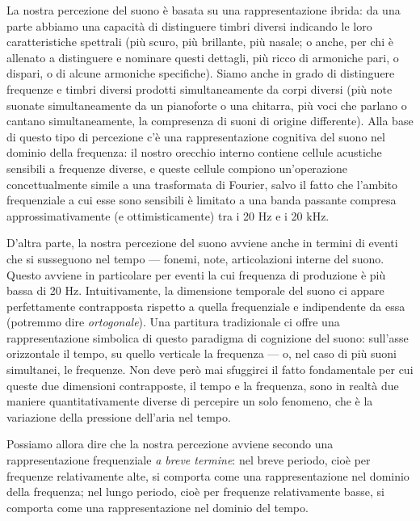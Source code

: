 \documentclass[11pt]{report}
\begin{document}
La nostra percezione del suono è basata su una rappresentazione ibrida: da una parte abbiamo una capacità di distinguere timbri diversi indicando le loro caratteristiche spettrali (più scuro, più brillante, più nasale; o anche, per chi è allenato a distinguere e nominare questi dettagli, più ricco di armoniche pari, o dispari, o di alcune armoniche specifiche). Siamo anche in grado di distinguere frequenze e timbri diversi prodotti simultaneamente da corpi diversi (più note suonate simultaneamente da un pianoforte o una chitarra, più voci che parlano o cantano simultaneamente, la compresenza di suoni di origine differente). Alla base di questo tipo di percezione c'è una rappresentazione cognitiva del suono nel dominio della frequenza: il nostro orecchio interno contiene cellule acustiche sensibili a frequenze diverse, e queste cellule compiono un'operazione concettualmente simile a una trasformata di Fourier, salvo il fatto che l'ambito frequenziale a cui esse sono sensibili è limitato a una banda passante compresa approssimativamente (e ottimisticamente) tra i 20 Hz e i 20 kHz.

D'altra parte, la nostra percezione del suono avviene anche in termini di eventi che si susseguono nel tempo --- fonemi, note, articolazioni interne del suono. Questo avviene in particolare per eventi la cui frequenza di produzione è più bassa di 20 Hz.  Intuitivamente, la dimensione temporale del suono ci appare perfettamente contrapposta rispetto a quella frequenziale e indipendente da essa (potremmo dire \emph{ortogonale}). Una partitura tradizionale ci offre una rappresentazione simbolica di questo paradigma di cognizione del suono: sull'asse orizzontale il tempo, su quello verticale la frequenza --- o, nel caso di più suoni simultanei, le frequenze. Non deve però mai sfuggirci il fatto fondamentale per cui queste due dimensioni contrapposte, il tempo e la frequenza, sono in realtà due maniere quantitativamente diverse di percepire un solo fenomeno, che è la variazione della pressione dell'aria nel tempo.

Possiamo allora dire che la nostra percezione avviene secondo una rappresentazione frequenziale \emph{a breve termine}: nel breve periodo, cioè per frequenze relativamente alte, si comporta come una rappresentazione nel dominio della frequenza; nel lungo periodo, cioè per frequenze relativamente basse, si comporta come una rappresentazione nel dominio del tempo.
\end{document}
